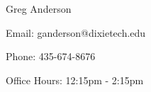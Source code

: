 Greg Anderson

Email: ganderson@dixietech.edu

Phone: 435-674-8676

Office Hours: 12:15pm - 2:15pm 
